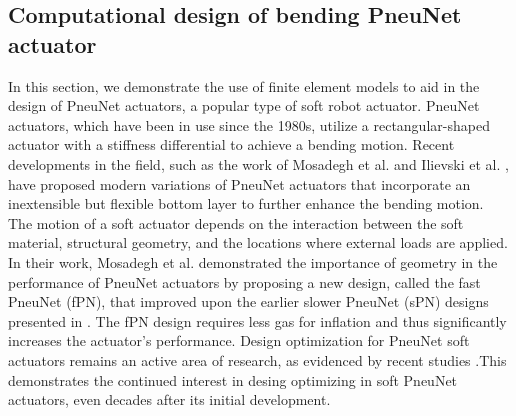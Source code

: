 
\subsection{Computational design of bending PneuNet actuator}
In this section, we demonstrate the use of finite element models to aid in the design of PneuNet actuators, a popular type of soft robot actuator. PneuNet actuators, which have been in use since the 1980s, utilize a rectangular-shaped actuator with a stiffness differential to achieve a bending motion. Recent developments in the field, such as the work of Mosadegh et al. \cite{Mosadegh2014} and Ilievski et al. \cite{Ilievski2011Feb}, have proposed modern variations of PneuNet actuators that incorporate an inextensible but flexible bottom layer to further enhance the bending motion. The motion of a soft actuator depends on the interaction between the soft material, structural geometry, and the locations where external loads are applied. In their work, Mosadegh et al. \cite{Mosadegh2014} demonstrated the importance of geometry in the performance of PneuNet actuators by proposing a new design, called the fast PneuNet (fPN), that improved upon the earlier slower PneuNet (sPN) designs presented in \cite{Ilievski2011Feb}. The fPN design requires less gas for inflation and thus significantly increases the actuator's performance. Design optimization for PneuNet soft actuators remains an active area of research, as evidenced by recent studies \cite{Smith2022,Raeisinezhad2021May}.This demonstrates the continued interest in desing optimizing in soft PneuNet actuators, even decades after its initial development.

